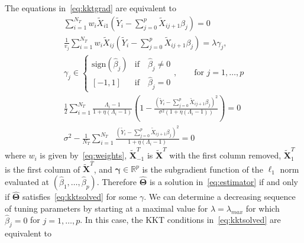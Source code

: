 \documentclass[12pt,letter]{article}\usepackage[]{graphicx}\usepackage[]{color}
\newcommand{\tm}[1]{\textrm{{#1}}}
\newcommand{\bX}{\textbf{X}}
\newcommand{\bXtilde}{\widetilde{\bX}}
\newcommand{\Xtilde}{\widetilde{X}}
\newcommand{\Ytilde}{\widetilde{Y}}
\newcommand{\bTheta}{\boldsymbol{\Theta}}
\begin{document}
The equations in~\eqref{eq:kktgrad} are equivalent to
\begin{equation}
	\begin{aligned}
		\sum_{i=1}^{N_T}w_i \Xtilde_{i1}\left(  \Ytilde_i - \sum_{j=0}^{p}\Xtilde_{ij+1}\beta_j \right)  = 0\\
		\frac{1}{v_j} \sum_{i=1}^{N_T}w_i \Xtilde_{ij}\left(  \Ytilde_i - \sum_{j=0}^{p}\Xtilde_{ij+1}\beta_j \right) =  \lambda \gamma_j, \\
		\gamma_j \in \begin{cases}
			\tm{sign}(\hat{\beta}_j) & \tm{if} \quad \hat{\beta}_j \neq 0 \\
			[-1,1] & \tm{if}\quad \hat{\beta}_j = 0
		\end{cases}, \qquad \tm{for }j=1, \ldots, p   \\
		\frac{1}{2} \sum_{i=1}^{N_T} \frac{\Lambda_i - 1}{1 + \eta(\Lambda_i - 1)} \left(1- \frac{\left(  \Ytilde_i - \sum_{j=0}^{p}\Xtilde_{ij+1}\beta_j \right) ^2}{\sigma^2 (1+\eta(\Lambda_i-1))}  \right) = 0  \\
		{\sigma^2} - \frac{1}{N_T}\sum_{i=1}^{N_T}\frac{\left(  \Ytilde_i - \sum_{j=0}^{p}\Xtilde_{ij+1}\beta_j \right) ^2}{1 + \eta (\Lambda_i-1)} = 0
	\end{aligned}\label{eq:kktsolved}
\end{equation}
where $w_i$ is given by~\eqref{eq:weights}, $\bXtilde^T_{-1}$ is $\bXtilde^T$ with the first column removed, $\bXtilde^T_1$ is the first column of $\bXtilde^T$, and $\boldsymbol{\gamma} \in \mathbb{R}^p$ is the subgradient function of the $\ell_1$ norm evaluated at $(\hat{\beta}_1, \ldots, \hat{\beta}_p)$. Therefore $\widehat{\bTheta}$ is a solution in~\eqref{eq:estimator} if and only if $\widehat{\bTheta}$ satisfies~\eqref{eq:kktsolved} for some $\gamma$. %
We can determine a decreasing sequence of tuning parameters by starting at a maximal value for $\lambda = \lambda_{max}$ for which $\hat{\beta}_j = 0$ for $j=1, \ldots, p$. In this case, the KKT conditions in~\eqref{eq:kktsolved} are equivalent to
\end{document}
